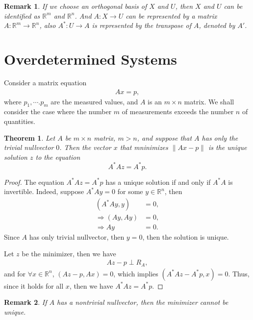 \documentclass[11pt]{book}
\newtheorem{theorem}{Theorem}[chapter]
\newtheorem{remark}{Remark}[chapter]
\theoremstyle{definition}
\numberwithin{equation}{chapter}
\begin{document}
\begin{remark}
If we choose an orthogonal basis of $X$ and $U$, then $X$ and $U$ can be identified as $\mathbb{R}^m$ and $\mathbb{R}^n$. And $A:X\to U$ can be represented by a matrix $A:\mathbb{R}^m\to \mathbb{R}^n$, also $A^*:U\to A$ is represented by the transpose of $A$, denoted by $A'$.
\end{remark}

\section{Overdetermined Systems}

Consider a matrix equation
\begin{align*}
    Ax = p,
\end{align*}
where $p_1,\cdots.p_m$ are the measured values, and $A$ is an $m\times n$ matrix. We shall
consider the case where the number $m$ of measurements exceeds the number $n$ of quantities. 

\medskip

\begin{theorem}
Let $A$ be $m\times n$ matrix, $m > n$, and suppose that $A$ has only the trivial nullvector $0$. Then the vector $x$ that mninimizes $\|Ax - p\|$ is the unique solution $z$ to the equation
$$A^* A z = A^* p.$$
\end{theorem}
\begin{proof}
The equation $A^* A z = A^* p$ has a unique solution if and only if $A^* A$ is invertible. Indeed, suppose $A^* Ay = 0$ for some $y \in \mathbb{R}^n$, then 
\begin{align*}
    (A^* A y, y) & = 0, \\
    \Rightarrow (Ay, Ay) & = 0, \\
    \Rightarrow Ay & = 0.
\end{align*}
Since $A$ has only trivial nullvector, then $y = 0$, then the solution is unique.

Let $z$ be the minimizer, then we have
\begin{align*}
    Az - p \perp R_A,
\end{align*}
and for $\forall x\in\mathbb{R}^n$, $(Az - p, Ax) = 0$, which implies $(A^*Az - A^*p, x) = 0$. Thus, since it holds for all $x$, then we have $A^*Az = A^*p$.
\end{proof}

\begin{remark}
If $A$ has a nontrivial nullvector, then the minimizer cannot be unique.
\end{remark}
\end{document}
